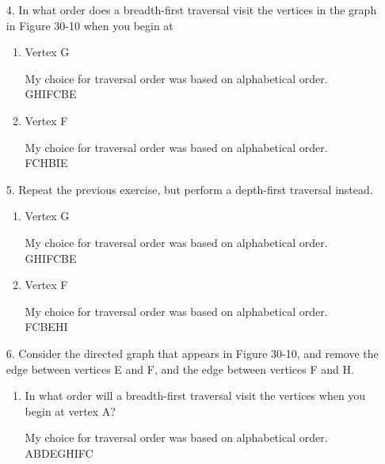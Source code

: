 \documentclass[10pt]{article}
\begin{document}
\begin{enumerate}
	\item[4.] In what order does a breadth-first traversal visit the vertices in the graph in Figure 30-10 when you begin at
		\begin{enumerate}
			\item Vertex G
				
				\vspace{0.5cm}
				My choice for traversal order was based on alphabetical order.\\
				GHIFCBE
				\vspace{0.5cm}
				
			\item Vertex F
				
				\vspace{0.5cm}
				My choice for traversal order was based on alphabetical order.\\
				FCHBIE
				\vspace{0.5cm}
				
		\end{enumerate}
	
	\item[5.] Repeat the previous exercise, but perform a depth-first traversal instead.
		\begin{enumerate}
			\item Vertex G
				
				\vspace{0.5cm}
				My choice for traversal order was based on alphabetical order.\\
				GHIFCBE
				\vspace{0.5cm}
			\item Vertex F
				
				\vspace{0.5cm}
				My choice for traversal order was based on alphabetical order.\\
				FCBEHI
				\vspace{0.5cm}
		\end{enumerate}
	
	\item[6.] Consider the directed graph that appears in Figure 30-10, and remove the edge between vertices E and F, and the edge between vertices F and H.
		\begin{enumerate}
			\item In what order will a breadth-first traversal visit the vertices when you begin at vertex A?
			
				\vspace{0.5cm}
				My choice for traversal order was based on alphabetical order.\\
				ABDEGHIFC
				\vspace{0.5cm}
				

\end{enumerate}
\end{enumerate}
\end{document}
